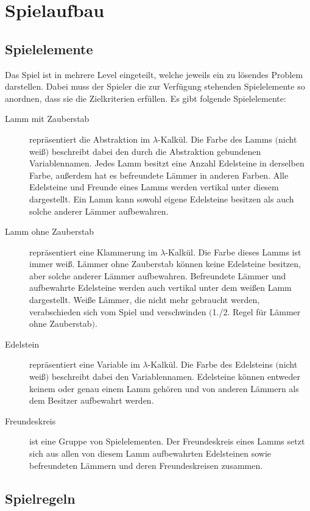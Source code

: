 \section{Spielaufbau}

\subsection{Spielelemente}

Das Spiel ist in mehrere Level eingeteilt, welche jeweils ein zu lösendes Problem darstellen. Dabei muss der Spieler die zur Verfügung stehenden Spielelemente so anordnen, dass sie die Zielkriterien erfüllen. Es gibt folgende Spielelemente:

\begin{description}
\item[Lamm mit Zauberstab] repräsentiert die Abstraktion im $\lambda$-Kalkül. Die Farbe des Lamms $($nicht weiß$)$ beschreibt dabei den durch die Abstraktion gebundenen Variablennamen. Jedes Lamm besitzt eine Anzahl Edelsteine in derselben Farbe, außerdem hat es befreundete Lämmer in anderen Farben. Alle Edelsteine und Freunde eines Lamms werden vertikal unter diesem dargestellt. Ein Lamm kann sowohl eigene Edelsteine besitzen als auch solche anderer Lämmer aufbewahren.
\item[Lamm ohne Zauberstab] repräsentiert eine Klammerung im $\lambda$-Kalkül. Die Farbe dieses Lamms ist immer weiß. Lämmer ohne Zauberstab können keine Edelsteine besitzen, aber solche anderer Lämmer aufbewahren. Befreundete Lämmer und aufbewahrte Edelsteine werden auch vertikal unter dem weißen Lamm dargestellt. Weiße Lämmer, die nicht mehr gebraucht werden, verabschieden sich vom Spiel und verschwinden $($1./2. Regel für Lämmer ohne Zauberstab$)$.
\item[Edelstein] repräsentiert eine Variable im $\lambda$-Kalkül. Die Farbe des Edelsteins $($nicht weiß$)$ beschreibt dabei den Variablennamen. Edelsteine können entweder keinem oder genau einem Lamm gehören und von anderen Lämmern als dem Besitzer aufbewahrt werden.
\item[Freundeskreis] ist eine Gruppe von Spielelementen. Der Freundeskreis eines Lamms setzt sich aus allen von diesem Lamm aufbewahrten Edelsteinen sowie befreundeten Lämmern und deren Freundeskreisen zusammen.
\end{description}

\subsection{Spielregeln}

